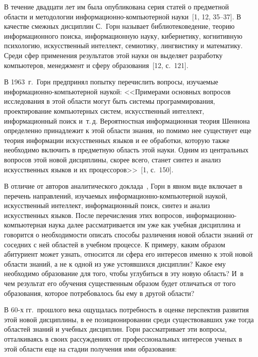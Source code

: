 \begin{multicols}{2}
      В течение двадцати лет им была опубликована серия статей о предметной области и
методологии информационно-компьютерной науки~[1, 12, 35--37]. 
В качестве смежных дисциплин С.~Горн называет библиотековедение, теорию
информационного поиска, информационную науку, кибернетику, когнитивную психологию,
искусственный интеллект, семиотику, лингвистику и математику. Среди сфер применения
результатов этой науки он выделяет разработку компьютеров, менеджмент и сферу
образования~[12, с.~121].

      В 1963~г.\ Горн предпринял попытку перечислить вопросы, изучаемые
ин\-фор\-ма\-ци\-он\-но-компью\-тер\-ной наукой: <<Примерами основных вопросов исследования в этой
области могут быть системы программирования, проектирование компьютерных систем,
искусственный интеллект, информационный поиск и~т.\,д. Вероятностная информационная
теория Шеннона определенно принадлежит к этой области знания, но помимо нее существует
еще теория информации искусственных языков и ее обработки, которую также необходимо
включить в предметную область этой науки. Одним из центральных вопросов этой новой
дисциплины, скорее всего, станет синтез и анализ искусственных языков и их
процессоров>>~[1, с.~150].

      В отличие от авторов аналитического доклада~\cite{10za}, Горн в явном виде
включает в перечень направ\-ле\-ний, изучаемых ин\-фор\-ма\-ци\-он\-но-ком\-пью\-тер\-ной наукой,
искусственный интеллект,  информационный поиск, синтез и анализ искусственных языков.
После перечисления этих вопросов, информационно-компьютерная наука \mbox{далее}
рассматривается им уже как учебная дис\-цип\-ли\-на и говорится о необходимости описать
способы различения новой области знаний от соседних с ней областей в учебном процессе. К
примеру, каким образом абитуриент может узнать, относится ли сфера его интересов именно к
этой новой об\-ласти знаний, а не к одной из уже устоявшихся дис\-цип\-лин? Какое ему
необходимо образование для того, чтобы углубиться в эту новую область? 
И~в чем результат
его обучения существенным образом будет отличаться от того образования, которое
потребовалось бы ему в другой области?

      В 60-х гг.\ прошлого века ощущалась потребность в оценке перспектив развития этой
новой дисциплины, в ее позиционировании среди существовавших уже тогда областей знаний и
учебных дисциплин. Горн рассматривает эти вопросы, отталкиваясь в своих рассуждениях от
профессиональных интересов ученых в этой области еще на стадии получения ими
образования:


\end{multicols}
